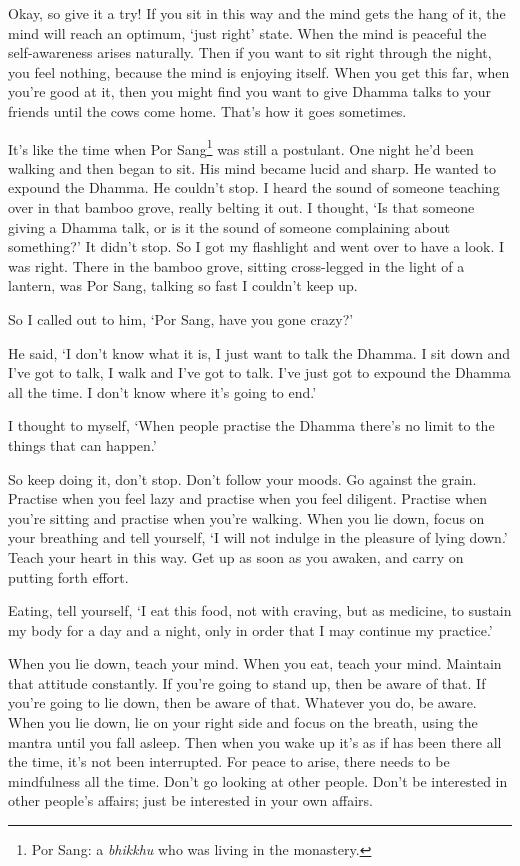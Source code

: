  Okay, so give it a try! If you sit in this way and the mind gets the hang of it, the mind will reach an optimum, `just right' state. When the mind is peaceful the self-awareness arises naturally. Then if you want to sit right through the night, you feel nothing, because the mind is enjoying itself. When you get this far, when you're good at it, then you might find you want to give Dhamma talks to your friends until the cows come home. That's how it goes sometimes. 

 It's like the time when Por Sang\footnote{Por Sang: a \textit{bhikkhu} who was living in the monastery.} was still a postulant. One night he'd been walking  and then began to sit. His mind became lucid and sharp. He wanted to expound the Dhamma. He couldn't stop. I heard the sound of someone teaching over in that bamboo grove, really belting it out. I thought, `Is that someone giving a Dhamma talk, or is it the sound of someone complaining about something?' It didn't stop. So I got my flashlight and went over to have a look. I was right. There in the bamboo grove, sitting cross-legged in the light of a lantern, was Por Sang, talking so fast I couldn't keep up. 

 So I called out to him, `Por Sang, have you gone crazy?' 

 He said, `I don't know what it is, I just want to talk the Dhamma. I sit down and I've got to talk, I walk and I've got to talk. I've just got to expound the Dhamma all the time. I don't know where it's going to end.' 

 I thought to myself, `When people practise the Dhamma there's no limit to the things that can happen.' 

 So keep doing it, don't stop. Don't follow your moods. Go against the grain. Practise when you feel lazy and practise when you feel diligent. Practise when you're sitting and practise when you're walking. When you lie down, focus on your breathing and tell yourself, `I will not indulge in the pleasure of lying down.' Teach your heart in this way. Get up as soon as you awaken, and carry on putting forth effort. 

 Eating, tell yourself, `I eat this food, not with craving, but as medicine, to sustain my body for a day and a night, only in order that I may continue my practice.' 

 When you lie down, teach your mind. When you eat, teach your mind. Maintain that attitude constantly. If you're going to stand up, then be aware of that. If you're going to lie down, then be aware of that. Whatever you do, be aware. When you lie down, lie on your right side and focus on the breath, using the mantra  until you fall asleep. Then when you wake up it's as if  has been there all the time, it's not been interrupted. For peace to arise, there needs to be mindfulness all the time. Don't go looking at other people. Don't be interested in other people's affairs; just be interested in your own affairs. 

